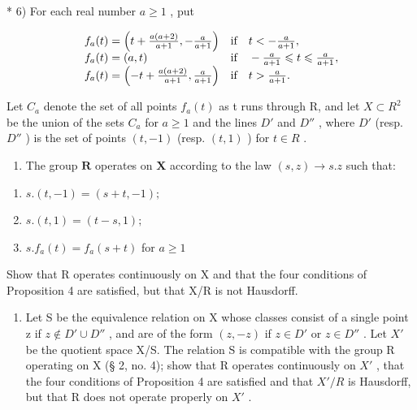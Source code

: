 * 6) For each real number \(a \geqslant 1\) , put

\[
\begin{array}{l l} f _ {a} (t) = \left(t + \frac {a (a + 2)}{a + 1}, - \frac {a}{a + 1}\right) & \text {if} \quad t <   - \frac {a}{a + 1}, \\ f _ {a} (t) = (a, t) & \text {if} \quad - \frac {a}{a + 1} \leqslant t \leqslant \frac {a}{a + 1}, \\ f _ {a} (t) = \left(- t + \frac {a (a + 2)}{a + 1}, \frac {a}{a + 1}\right) & \text {if} \quad t > \frac {a}{a + 1}. \end{array}
\]

Let \(C_{a}\) denote the set of all points \(f_{a}(t)\) as t runs through R, and let \(X \subset R^{2}\) be the union of the sets \(C_{a}\) for \(a \geqslant 1\) and the lines \(D'\) and \(D''\) , where \(D'\) (resp. \(D''\) ) is the set of points \((t, -1)\) (resp. \((t, 1)\) ) for \(t \in R\) .

\begin{enumerate}
\def\labelenumi{\alph{enumi})}
\tightlist
\item
  The group \(\mathbf{R}\) operates on \(\mathbf{X}\) according to the law \((s, z) \to s.z\) such that:
\end{enumerate}

\begin{enumerate}
\def\labelenumi{(\roman{enumi})}
\item
  \(s.(t, -1) = (s + t, -1);\)
\item
  \(s.(t,1) = (t - s,1);\)
\item
  \(s.f_{a}(t) = f_{a}(s + t)\) for \(a\geqslant 1\)
\end{enumerate}

Show that R operates continuously on X and that the four conditions of Proposition 4 are satisfied, but that X/R is not Hausdorff.

\begin{enumerate}
\def\labelenumi{\alph{enumi})}
\setcounter{enumi}{1}
\tightlist
\item
  Let S be the equivalence relation on X whose classes consist of a single point z if \(z \notin D' \cup D''\) , and are of the form \((z, -z)\) if \(z \in D'\) or \(z \in D''\) . Let \(X'\) be the quotient space X/S. The relation S is compatible with the group R operating on X (§ 2, no. 4); show that R operates continuously on \(X'\) , that the four conditions of Proposition 4 are satisfied and that \(X'/R\) is Hausdorff, but that R does not operate properly on \(X'\) .
\end{enumerate}


